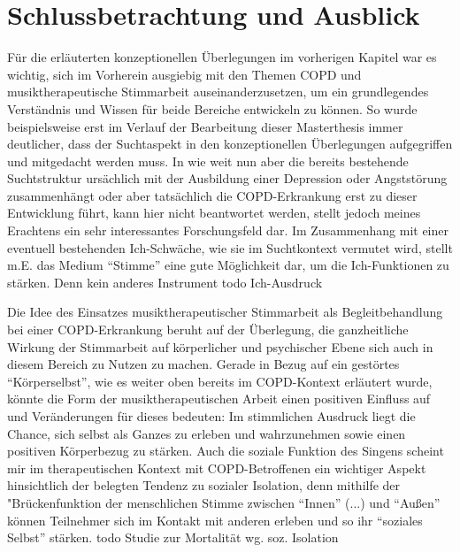 \chapter{Schlussbetrachtung und Ausblick} %
Für die erläuterten konzeptionellen Überlegungen im vorherigen Kapitel war es wichtig, sich im Vorherein ausgiebig mit den Themen COPD und musiktherapeutische Stimmarbeit auseinanderzusetzen, um ein grundlegendes Verständnis und Wissen für beide Bereiche entwickeln zu können. So wurde beispielsweise erst im Verlauf der Bearbeitung dieser Masterthesis immer deutlicher, dass der Suchtaspekt in den konzeptionellen Überlegungen aufgegriffen und mitgedacht werden muss. In wie weit nun aber die bereits bestehende Suchtstruktur ursächlich mit der Ausbildung einer Depression oder Angststörung zusammenhängt oder aber tatsächlich die COPD-Erkrankung erst zu dieser Entwicklung führt, kann hier nicht beantwortet werden, stellt jedoch meines Erachtens ein sehr interessantes Forschungsfeld dar. Im Zusammenhang mit einer eventuell bestehenden Ich-Schwäche, wie sie im Suchtkontext vermutet wird, stellt m.E. das Medium "`Stimme"' eine gute Möglichkeit dar, um die Ich-Funktionen zu stärken. Denn kein anderes Instrument todo Ich-Ausdruck

Die Idee des Einsatzes musiktherapeutischer Stimmarbeit als Begleitbehandlung bei einer COPD-Erkrankung beruht auf der Überlegung, die ganzheitliche Wirkung der Stimmarbeit auf körperlicher und psychischer Ebene sich auch in diesem Bereich zu Nutzen zu machen. Gerade in Bezug auf ein gestörtes "`Körperselbst"', wie es weiter oben bereits im COPD-Kontext erläutert wurde, könnte die Form der musiktherapeutischen Arbeit einen positiven Einfluss auf und Veränderungen für dieses bedeuten: Im stimmlichen Ausdruck liegt die Chance, sich selbst als Ganzes zu erleben und wahrzunehmen sowie einen positiven Körperbezug zu stärken. Auch die soziale Funktion des Singens scheint mir im therapeutischen Kontext mit COPD-Betroffenen ein wichtiger Aspekt hinsichtlich der belegten Tendenz zu sozialer Isolation, denn mithilfe der "Brückenfunktion der menschlichen Stimme zwischen "`Innen"' (...) und "`Außen"' können Teilnehmer sich im Kontakt mit anderen erleben und so ihr "`soziales Selbst"' stärken. todo Studie zur Mortalität wg. soz. Isolation




